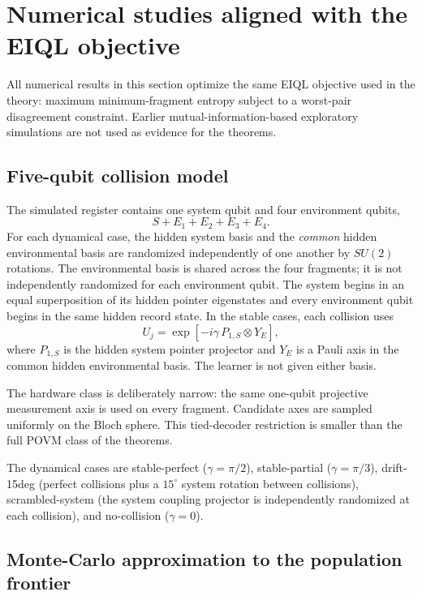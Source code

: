 \section{Numerical studies aligned with the EIQL objective}

All numerical results in this section optimize the same EIQL objective used in the theory: maximum minimum-fragment entropy subject to a worst-pair disagreement constraint. Earlier mutual-information-based exploratory simulations are not used as evidence for the theorems.

\subsection{Five-qubit collision model}

The simulated register contains one system qubit and four environment qubits,
\[
S+E_1+E_2+E_3+E_4.
\]
For each dynamical case, the hidden system basis and the \emph{common} hidden environmental basis are randomized independently of one another by $SU(2)$ rotations. The environmental basis is shared across the four fragments; it is not independently randomized for each environment qubit. The system begins in an equal superposition of its hidden pointer eigenstates and every environment qubit begins in the same hidden record state. In the stable cases, each collision uses
\begin{equation}
U_j=\exp\!\left[-i\gamma\,P_{1,S}\otimes Y_E\right],
\label{eq:collision}
\end{equation}
where $P_{1,S}$ is the hidden system pointer projector and $Y_E$ is a Pauli axis in the common hidden environmental basis. The learner is not given either basis.

The hardware class is deliberately narrow: the same one-qubit projective measurement axis is used on every fragment. Candidate axes are sampled uniformly on the Bloch sphere. This tied-decoder restriction is smaller than the full POVM class of the theorems.

The dynamical cases are stable-perfect ($\gamma=\pi/2$), stable-partial ($\gamma=\pi/3$), drift-15deg (perfect collisions plus a $15^\circ$ system rotation between collisions), scrambled-system (the system coupling projector is independently randomized at each collision), and no-collision ($\gamma=0$).

\subsection{Monte-Carlo approximation to the population frontier}


